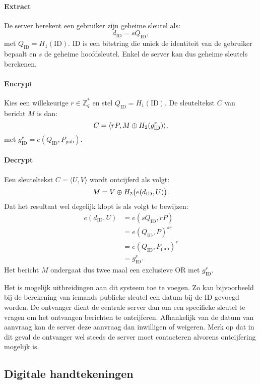 \paragraph{Extract} De server berekent een gebruiker zijn geheime sleutel als:
\[d_{\text{ID}} = s Q_{\text{ID}},\]
met $Q_{\text{ID}} = H_1(\text{ID})$. ID is een bitstring die uniek de identiteit van de gebruiker bepaalt en $s$ de geheime hoofdsleutel. Enkel de server kan dus geheime sleutels berekenen.

\paragraph{Encrypt} Kies een willekeurige $r \in \mathbb{Z}_q^*$ en stel $Q_{\text{ID}} = H_1(\text{ID})$. De sleuteltekst $C$ van bericht $M$ is dan:
\[C = \langle rP, M \oplus H_2(g_{\text{ID}}^r) \rangle,\]
met $g_{\text{ID}}^r = e(Q_{\text{ID}}, P_{\text{pub}})$.

\paragraph{Decrypt} Een sleuteltekst $C = \langle U, V \rangle$ wordt ontcijferd als volgt:
\[M = V \oplus H_2\big( e(d_{\text{ID}}, U) \big).\]
Dat het resultaat wel degelijk klopt is als volgt te bewijzen:
\[\begin{aligned}
e(d_{\text{ID}}, U)	&= e(sQ_{\text{ID}}, rP)\\
							&= e(Q_{\text{ID}}, P)^{sr}\\
							&= e(Q_{\text{ID}}, P_{\text{pub}})^r\\
							&= g_{\text{ID}}^r.
\end{aligned}\]
Het bericht $M$ ondergaat dus twee maal een exclusieve OR met $g_{\text{ID}}^r$.

Het is mogelijk uitbreidingen aan dit systeem toe te voegen. Zo kan bijvoorbeeld bij de berekening van iemands publieke sleutel een datum bij de ID gevoegd worden. De ontvanger dient de centrale server dan om een specifieke sleutel te vragen om het ontvangen berichten te ontcijferen. Afhankelijk van de datum van aanvraag kan de server deze aanvraag dan inwilligen of weigeren. Merk op dat in dit geval de ontvanger wel steeds de server moet contacteren alvorens ontcijfering mogelijk is.

\subsection{Digitale handtekeningen}

